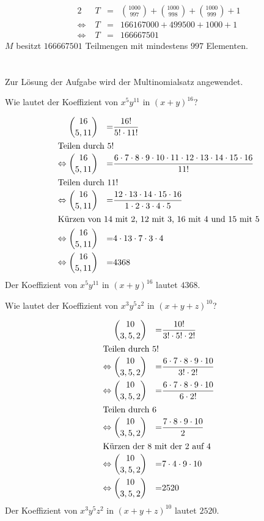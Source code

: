 \documentclass[10pt,a4paper,oneside,ngerman,numbers=noenddot]{scrartcl}
\begin{document}
\begin{alignat}{2}
&\; T &=& \binom{1000}{997} + \binom{1000}{998} + \binom{1000}{999} + 1 \\
\Leftrightarrow &\; T &=& 166167000 + 499500 + 1000 + 1 \\
\Leftrightarrow &\; T &=& 166667501
\end{alignat}
$M$ besitzt $166667501$ Teilmengen mit mindestens $997$ Elementen.
\section{} %
\subsection{} %
Zur Lösung der Aufgabe wird der Multinomialsatz angewendet. 

Wie lautet der Koeffizient von $x^{5}y^{11}$ in $(x+y)^{16}$?

\begin{alignat}{2}
&\; \binom{16}{5,11} &=& \frac{16!}{5! \cdot 11!} \\
\intertext{Teilen durch $5!$}
\Leftrightarrow &\; \binom{16}{5,11} &=& \frac{6 \cdot 7 \cdot 8 \cdot 9 \cdot 10 \cdot 11 \cdot 12 \cdot 13 \cdot 14 \cdot 15 \cdot 16}{11!} \\
\intertext{Teilen durch $11!$}
\Leftrightarrow &\; \binom{16}{5,11} &=& \frac{12 \cdot 13 \cdot 14 \cdot 15 \cdot 16}{1 \cdot 2 \cdot 3 \cdot 4 \cdot 5} \\
\intertext{Kürzen von 14 mit 2, 12 mit 3, 16 mit 4 und 15 mit 5}
\Leftrightarrow &\; \binom{16}{5,11} &=& 4 \cdot 13 \cdot 7 \cdot 3 \cdot 4 \\
\Leftrightarrow &\; \binom{16}{5,11} &=& 4368
\end{alignat}
Der Koeffizient von $x^{5}y^{11}$ in $(x+y)^{16}$ lautet $4368$.

Wie lautet der Koeffizient von $x^{3}y^{5}z^{2}$ in $(x+y+z)^{10}$?

\begin{alignat}{2}
&\; \binom{10}{3,5,2} &=& \frac{10!}{3! \cdot 5! \cdot 2!} \\
\intertext{Teilen durch $5!$}
\Leftrightarrow &\; \binom{10}{3,5,2} &=& \frac{6 \cdot 7 \cdot 8 \cdot 9 \cdot 10}{3! \cdot 2!} \\
\Leftrightarrow &\; \binom{10}{3,5,2} &=& \frac{6 \cdot 7 \cdot 8 \cdot 9 \cdot 10}{6 \cdot 2!} \\
\intertext{Teilen durch 6}
\Leftrightarrow &\; \binom{10}{3,5,2} &=& \frac{7 \cdot 8 \cdot 9 \cdot 10}{2} \\
\intertext{Kürzen der $8$ mit der $2$ auf $4$}
\Leftrightarrow &\; \binom{10}{3,5,2} &=& 7 \cdot 4 \cdot 9 \cdot 10 \\
\Leftrightarrow &\; \binom{10}{3,5,2} &=& 2520
\end{alignat}
Der Koeffizient von $x^{3}y^{5}z^{2}$ in $(x+y+z)^{10}$ lautet $2520$.
\end{document}
